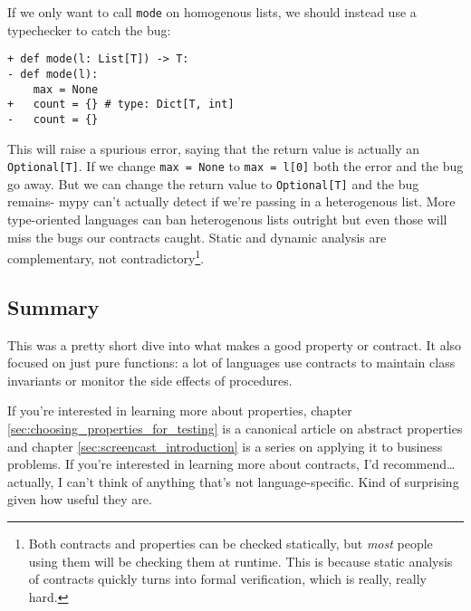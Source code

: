 If we only want to call \texttt{mode} on homogenous lists, we should
instead use a typechecker to catch the bug:

\begin{verbatim}
+ def mode(l: List[T]) -> T:
- def mode(l):
    max = None
+   count = {} # type: Dict[T, int]
-   count = {}
\end{verbatim}
This will raise a spurious error, saying that the return value is
actually an \texttt{Optional{[}T{]}}. If we change \texttt{max\ =\ None}
to \texttt{max\ =\ l{[}0{]}} both the error and the bug go away. But we
can change the return value to \texttt{Optional{[}T{]}} and the bug
remains- mypy can't actually detect if we're passing in a heterogenous
list. More type-oriented languages can ban heterogenous lists outright
but even those will miss the bugs our contracts caught. Static and
dynamic analysis are complementary, not
contradictory\footnote{Both contracts and properties can be checked statically, but \textit{most} people using them will be checking them at runtime. This is because static analysis of contracts quickly turns into formal verification, which is really, really hard. }.

\subsection{Summary}

This was a pretty short dive into what makes a good property or
contract. It also focused on just pure functions: a lot of languages use
contracts to maintain class invariants or monitor the side effects of
procedures.

If you're interested in learning more about properties,
chapter \ref{sec:choosing_properties_for_testing}
is a canonical article on abstract properties and chapter \ref{sec:screencast_introduction}
is a series on applying it to business problems. If you're interested in
learning more about contracts, I'd recommend\ldots{} actually, I can't
think of anything that's not language-specific. Kind of surprising given
how useful they are.


